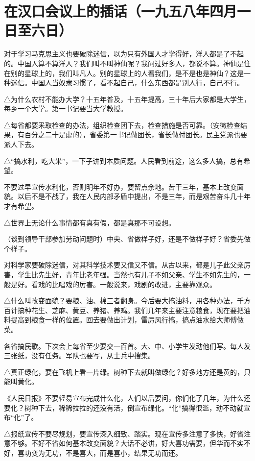 \section[在汉口会议上的插话（一九五八年四月一日至六日）]{在汉口会议上的插话（一九五八年四月一日至六日）}


对于学习马克思主义也要破除迷信，以为只有外国人才学得好，洋人都是了不起的。中国人算不算洋人？我们叫不叫神仙呢？我问过好多人，都说不算。神仙是住在别的星球上的，我们叫凡人。别的星球上的人看我们，是不是也是神仙？这是一种迷信。中国人当奴隶习惯了，看不起自己，什么东西都是别人行，自己不行。

△为什么农村不能办大学？十五年普及，十五年提高，三十年后大家都是大学生，每乡一个大学。第一书记要当大学教授。

△每省都要釆取检查的办法，组织检查团下去，检查措施是否可靠。（安徽检查结果，有百分之二十是虚的），省委第一书记做团长，省长做付团长。民主党派也要派人下去。

△“搞水利，吃大米”，一下子讲到本质问题。人民看到前途，这么多人搞，总有希望。

不要过早宣传水利化，否则明年不好办，要留点余地。苦干三年，基本上改变面貌。以后不是不战了，我在人民内部矛盾中提出，不是三年，而是艰苦奋斗几十年才有希望。

△世界上无论什么事情都有真有假，都是真那不可设想。

（谈到领导干部参加劳动问题时）中央、省做样子好，还是不做样子好？省委先做个样子。

对科学家要破除迷信，对其科学技术要又信又不信。从古以来，都是儿子此父亲厉害，学生比先生好，青年比老年强。当然也有儿子不如父亲、学生不如先生的，一般是好。看戏的比唱戏的厉害。一般说来，戏剧的改进，主要靠观众。

△什么叫改变面貌？要粮、油、棉三者翻身。今后要大搞油料，用各种办法，千方百计搞种花生、芝麻、黄豆、养猪、养鸡。我们几年来主要注意粮食，现在要把油料提高到粮食一样的位置。回去要做出计划，雷厉风行搞，搞点油水给大师傅做菜。

各省搞民歌。下次会上每省至少要交一百首。大、中、小学生发动他们写。每人发三张纸，没有任务。军队也要写，从士兵中搜集。

△真正绿化，要在飞机上看一片绿。树种下去就叫做绿化？好多地方还是黄的，只能叫黄化。

《人民日报》不要轻易宣布完成什么化，人们以后要问，你们化了几年，为什么还要化？树种下去，稀稀拉拉的还没有活，倒宣布绿化。“化”搞得很滥，动不动就宣布“化”了。

△报纸宣传不要尽规划，要宣传深入细致、踏实。现在宣传多注意了多快，好省注意不够。不好不省如何基本改变面貌？大话不必讲，好大喜功需要，但华而不实不好，喜功变为无功，不是喜大，而是喜小，结果无功而还。


